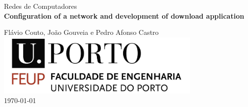 \documentclass[11pt,a4paper,reqno]{article}
\numberwithin{equation}{section}
\begin{document}
\begin{titlepage}
\begin{center}
 
\vspace*{3cm}

{\Large Redes de Computadores}\\[2cm]

{\Huge \bfseries Configuration of a network and development of download application \\[1cm]}

{\large Flávio Couto, João Gouveia e Pedro Afonso Castro}\\[2cm]

\includegraphics[width=10cm]{feup_logo.jpg}\\[2cm]


{\large \today}

\end{center}
\end{titlepage}

\begin{abstract}
This report aims to explain our approach regarding the second project proposed by our teachers in the subject “Redes de Computadores”. This project was split into two parts. The development of a download application, using TCP sockets to connect to an FTP server to download the file requested by the user, and into the configuration and studying of a computer network, consisting in configuring an Internet Protocol (IP) network, implementing virtual LANs (VLANs) in a switch, configuring a router and a commercial router, implementing Network Address Translation (NAT) and configuring the Domain Name System (DNS), establishing a TCP connection (using the application developed in the first part of the project).

Our group managed to comprehend and reach all the purposed goals with success, as we will show in this report.

\end{abstract}

\tableofcontents
\newpage

\end{document}
